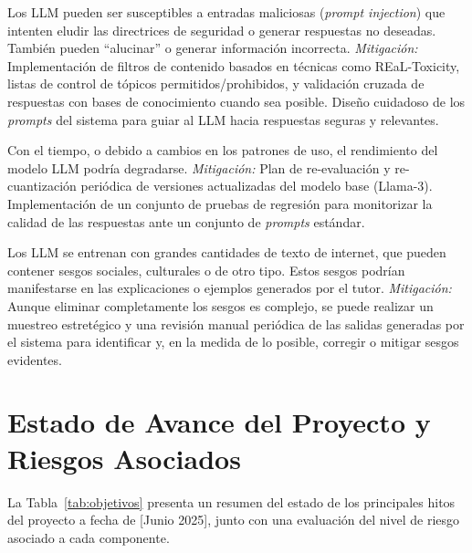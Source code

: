 \begin{description}[leftmargin=*, style=unboxed,font=\normalfont] %
  \item[Generación de contenido inapropiado o incorrecto (\emph{Prompt Injection} y Alucinaciones):]
        Los LLM pueden ser susceptibles a entradas maliciosas (\emph{prompt injection}) que intenten eludir las directrices de seguridad o generar respuestas no deseadas. También pueden ``alucinar'' o generar información incorrecta.
        \textit{Mitigación:} Implementación de filtros de contenido basados en técnicas como REaL-Toxicity, listas de control de tópicos permitidos/prohibidos, y validación cruzada de respuestas con bases de conocimiento cuando sea posible. Diseño cuidadoso de los \emph{prompts} del sistema para guiar al LLM hacia respuestas seguras y relevantes.
  \item[Degradación del rendimiento del modelo:]
        Con el tiempo, o debido a cambios en los patrones de uso, el rendimiento del modelo LLM podría degradarse.
        \textit{Mitigación:} Plan de re-evaluación y re-cuantización periódica de versiones actualizadas del modelo base (Llama-3). Implementación de un conjunto de pruebas de regresión para monitorizar la calidad de las respuestas ante un conjunto de \emph{prompts} estándar.
  \item[Sesgos inherentes en los datos de entrenamiento del LLM:]
        Los LLM se entrenan con grandes cantidades de texto de internet, que pueden contener sesgos sociales, culturales o de otro tipo. Estos sesgos podrían manifestarse en las explicaciones o ejemplos generados por el tutor.
        \textit{Mitigación:} Aunque eliminar completamente los sesgos es complejo, se puede realizar un muestreo estretégico y una revisión manual periódica de las salidas generadas por el sistema para identificar y, en la medida de lo posible, corregir o mitigar sesgos evidentes.
\end{description}

\section{Estado de Avance del Proyecto y Riesgos Asociados}
\label{sec:estado_avance_proyecto}

La Tabla~\ref{tab:objetivos} presenta un resumen del estado de los principales hitos del proyecto a fecha de [Junio 2025], junto con una evaluación del nivel de riesgo asociado a cada componente.

